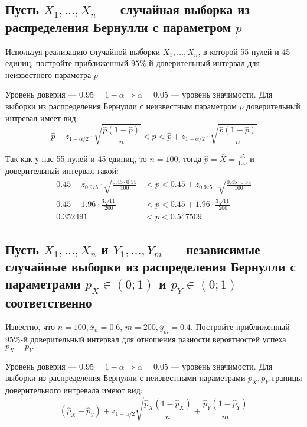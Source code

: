 \documentclass{article}
\begin{document}
\subsection{Пусть $X_{1}, \ldots, X_{n}$ — случайная выборка из распределения Бернулли с параметром $p$}
Используя реализацию случайной выборки $X_{1}, \ldots, X_{n}$, в которой 55 нулей и 45 единиц, постройте приближенный $95 \%$-й доверительный интервал для неизвестного параметра $p$

Уровень доверия — $0.95=1-\alpha\Longrightarrow\alpha=0.05$ — уровень значимости. Для выборки из распределения Бернулли с неизвестным параметром $p$ доверительный интревал имеет вид:
\begin{equation*}
    \widehat{p}-z_{1-\alpha/2}\cdot\sqrt{\frac{\widehat{p}(1-\widehat{p})}{n}}<p<\widehat{p}+z_{1-\alpha/2}\cdot\sqrt{\frac{\widehat{p}(1-\widehat{p})}{n}}
\end{equation*}

Так как у нас 55 нулей и 45 единиц, то $n=100$, тогда $\widehat{p}=\overline{X}=\frac{45}{100}$ и доверительный интервал такой:
\begin{equation*}
    \begin{aligned}
        0.45-z_{0.975}\cdot\sqrt{\frac{0.45\cdot0.55}{100}}&<p<0.45+z_{0.975}\cdot\sqrt{\frac{0.45\cdot0.55}{100}}\\
        0.45-1.96\cdot\frac{3\sqrt{11}}{200}&<p<0.45+1.96\cdot\frac{3\sqrt{11}}{200}\\
        0.352491&<p<0.547509
    \end{aligned}
\end{equation*}

\subsection{Пусть $X_{1}, \ldots, X_{n}$ и $Y_{1}, \ldots, Y_{m}$ — независимые случайные выборки из распределения Бернулли с параметрами $p_{X} \in(0 ; 1)$ и $p_{Y} \in(0 ; 1)$ соответственно}
Известно, что $n=100, \overline{x}_{n}=0.6$, $m=200, \overline{y}_{m}=0.4$. Постройте приближенный $95 \%$-й доверительный интервал для отношения разности вероятностей успеха $p_{X}-p_{Y}$

Уровень доверия — $0.95=1-\alpha\Longrightarrow\alpha=0.05$ — уровень значимости. Для выборки из распределения Бернулли с неизвестными параметрами $p_X,p_Y$ границы доверительного интревала имеют вид:
\begin{equation*}
    \left(\widehat{p}_X-\widehat{p}_Y\right)\mp z_{1-\alpha/2}\sqrt{\frac{\widehat{p}_X(1-\widehat{p}_X)}{n}+\frac{\widehat{p}_Y(1-\widehat{p}_Y)}{m}}
\end{equation*}
\end{document}
